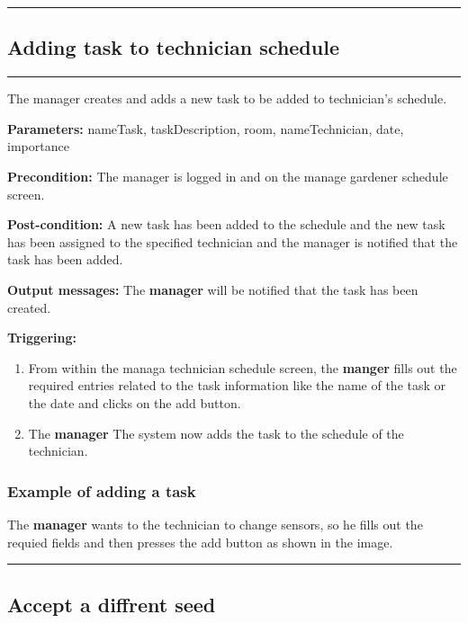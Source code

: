 \hfill
\vspace{0.5cm}
\hrule
\break


\subsection{Adding task to technician schedule}

\hrule
\hfill
\vspace{0.5cm}
\label{operation:addTaskTechnichian}

The manager creates and adds a new task to be added to technician's schedule.
\begin{description}

\item \textbf{Parameters:} nameTask, taskDescription, room, nameTechnician,
date, importance
\item \textbf{Precondition:} The manager is logged in and on the manage gardener
schedule screen.
\item \textbf{Post-condition:} A new task has been added to the schedule and the
new task has been assigned to the specified technician and the manager is
notified that the task has been added.
\item \textbf{Output messages:} The \textbf{manager} will be notified that the
task has been created.

\item \textbf{Triggering:}
\begin{enumerate}
\item From within the managa technician schedule screen, the \textbf{manger}
fills out the required entries related to the task information like the name of the task or
the date and clicks on the add button.
\item The \textbf{manager} The system now adds the task to the schedule of the
technician.
\end{enumerate}
\end{description}
\subsubsection{Example of adding a task}
The \textbf{manager} wants to the technician to change sensors, so he fills out
the requied fields and then presses the add button as shown in the image.
\hfill
\vspace{0.5cm}
\hrule

\subsection{Accept a diffrent seed}

